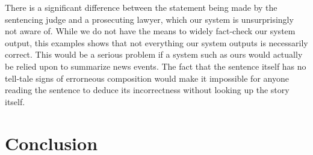 \documentclass[a4paper,BCOR=10mm]{report}
\numberwithin{lemma}{chapter}
\numberwithin{definition}{chapter}
\begin{document}
There is a significant difference between the statement being made by the sentencing judge and a prosecuting lawyer, which our system is unsurprisingly not aware of.
While we do not have the means to widely fact-check our system output, this examples shows that not everything our system outputs is necessarily correct.
This would be a serious problem if a system such as ours would actually be relied upon to summarize news events. The fact that the sentence itself has no tell-tale signs of errorneous composition would make it impossible for anyone reading the sentence to deduce its incorrectness without looking up the story itself.





\chapter{Conclusion}


 
\end{document}
